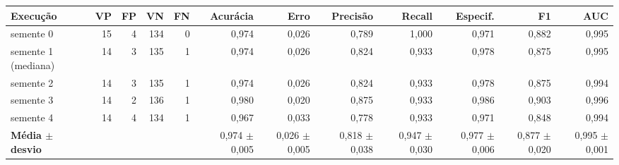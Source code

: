 \begin{tabular}{lrrrrrrrrrrr}
\toprule
Execução & VP & FP & VN & FN & Acurácia & Erro & Precisão & Recall & Especif. & F1 & AUC \\
\midrule
semente 0 & 15 & 4 & 134 & 0 & 0,974 & 0,026 & 0,789 & 1,000 & 0,971 & 0,882 & 0,995 \\
semente 1 (mediana) & 14 & 3 & 135 & 1 & 0,974 & 0,026 & 0,824 & 0,933 & 0,978 & 0,875 & 0,995 \\
semente 2 & 14 & 3 & 135 & 1 & 0,974 & 0,026 & 0,824 & 0,933 & 0,978 & 0,875 & 0,994 \\
semente 3 & 14 & 2 & 136 & 1 & 0,980 & 0,020 & 0,875 & 0,933 & 0,986 & 0,903 & 0,996 \\
semente 4 & 14 & 4 & 134 & 1 & 0,967 & 0,033 & 0,778 & 0,933 & 0,971 & 0,848 & 0,994 \\
\midrule
\textbf{Média $\pm$ desvio} & & & & & 0,974 $\pm$ 0,005 & 0,026 $\pm$ 0,005 & 0,818 $\pm$ 0,038 & 0,947 $\pm$ 0,030 & 0,977 $\pm$ 0,006 & 0,877 $\pm$ 0,020 & 0,995 $\pm$ 0,001 \\
\bottomrule
\end{tabular}
